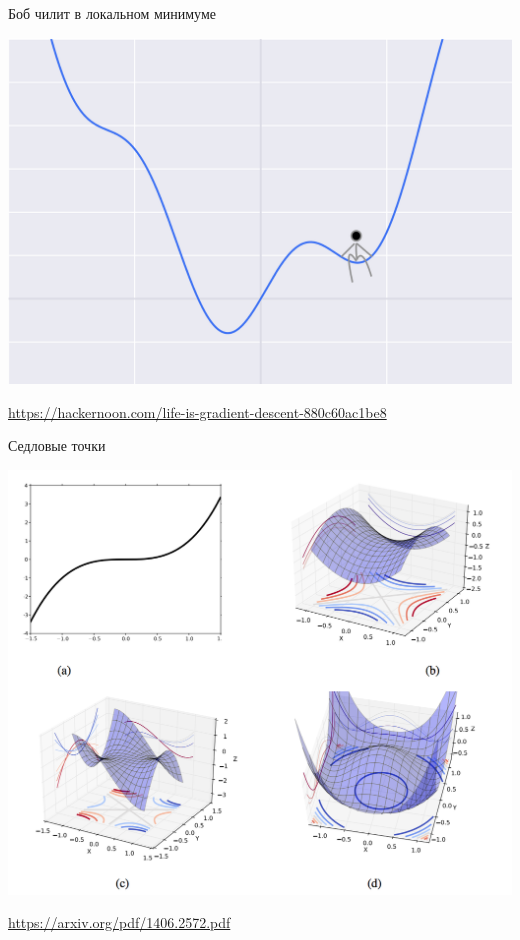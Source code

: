 \documentclass[notes,12pt, aspectratio=169]{beamer}
\begin{document}
\begin{frame}{Боб чилит в локальном минимуме}
\begin{center}
	\includegraphics[width=0.6\paperwidth]{bob_local_chill.png}
\end{center}
\vfill %
\footnotesize 
\color{blue} \url{https://hackernoon.com/life-is-gradient-descent-880c60ac1be8}
\end{frame}


\begin{frame}{Седловые точки}
\begin{center}
\includegraphics[width=0.5\paperwidth]{sedlo.png}
\end{center}
\vfill %
\footnotesize 
\color{blue} \url{https://arxiv.org/pdf/1406.2572.pdf}
\end{frame}
\end{document}
